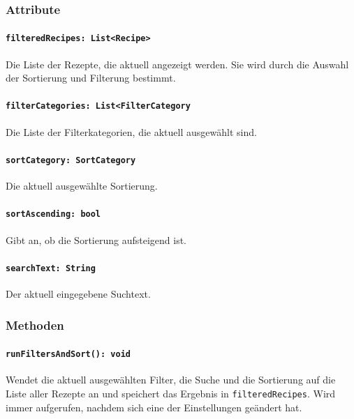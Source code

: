 \documentclass{entwurfsheft}
\begin{document}
\begin{sloppypar}
\subsubsection*{Attribute}
\paragraph{\texttt{filteredRecipes: List<Recipe>}}
Die Liste der Rezepte, die aktuell angezeigt werden. Sie wird durch die Auswahl der Sortierung und Filterung bestimmt.
\paragraph{\texttt{filterCategories: List<FilterCategory}}
Die Liste der Filterkategorien, die aktuell ausgewählt sind.
\paragraph{\texttt{sortCategory: SortCategory}}
Die aktuell ausgewählte Sortierung.
\paragraph{\texttt{sortAscending: bool}}
Gibt an, ob die Sortierung aufsteigend ist.
\paragraph{\texttt{searchText: String}}
Der aktuell eingegebene Suchtext.
\subsubsection*{Methoden}
\paragraph{\texttt{runFiltersAndSort(): void}}
Wendet die aktuell ausgewählten Filter, die Suche und die Sortierung auf die Liste aller Rezepte an und speichert das Ergebnis in \texttt{filteredRecipes}. Wird immer aufgerufen, nachdem sich eine der Einstellungen geändert hat.
\newpage

\end{sloppypar}
\end{document}
